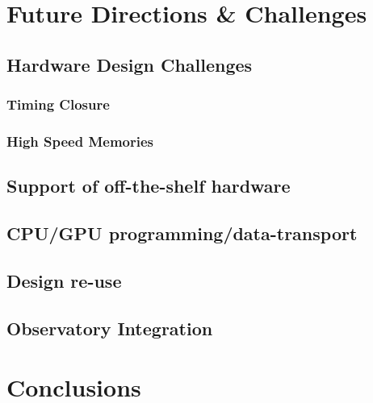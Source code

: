 \documentclass{ws-jai}
\begin{document}

\section{Future Directions \& Challenges} \label{sec:Future}

\subsection{Hardware Design Challenges}

\subsubsection{Timing Closure}

\subsubsection{High Speed Memories} \label{sec: HSM}


\subsection{Support of off-the-shelf hardware}

\subsection{CPU/GPU programming/data-transport}

\subsection{Design re-use}

\subsection{Observatory Integration}


\section{Conclusions} \label{sec:Conclusions}





\end{document}
